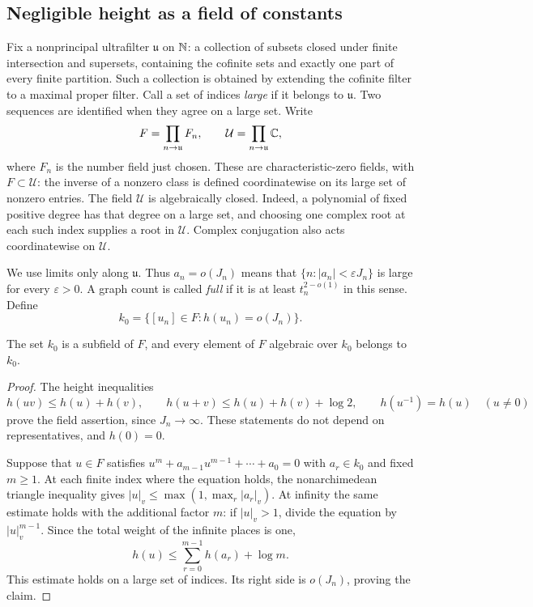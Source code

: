 \subsection{Negligible height as a field of constants}

Fix a nonprincipal ultrafilter \(\mathfrak u\) on \(\mathbb N\): a collection of
subsets closed under finite intersection and supersets, containing the
cofinite sets and exactly one part of every finite partition. Such a
collection is obtained by extending the cofinite filter to a maximal
proper filter. Call a set of indices \emph{large} if it belongs to
\(\mathfrak u\). Two sequences are identified when they agree on a large
set. Write
\[
 F=\prod_{n\to\mathfrak u} F_n,
 \qquad
 \mathcal U=\prod_{n\to\mathfrak u}\mathbb C,
\]
where \(F_n\) is the number field just chosen. These are characteristic-zero
fields, with \(F\subset\mathcal U\): the inverse of a nonzero class is
defined coordinatewise on its large set of nonzero entries. The field
\(\mathcal U\) is algebraically closed. Indeed, a polynomial of fixed
positive degree has that degree on a large set, and choosing one complex
root at each such index supplies a root in \(\mathcal U\). Complex
conjugation also acts coordinatewise on \(\mathcal U\).

We use limits only along \(\mathfrak u\). Thus \(a_n=o(J_n)\) means that
\(\{n:\lvert a_n\rvert<\varepsilon J_n\}\) is large for every
\(\varepsilon>0\). A graph count is called \emph{full}
if it is at least \(t_n^{2-o(1)}\) in this sense. Define
\[
 k_0=\bigl\{[u_n]\in F:h(u_n)=o(J_n)\bigr\}.
\]

\begin{lemma}\label{alg:small-height-field}
The set \(k_0\) is a subfield of \(F\), and every element of \(F\)
algebraic over \(k_0\) belongs to \(k_0\).
\end{lemma}

\begin{proof}
The height inequalities
\[
 h(uv)\le h(u)+h(v),\qquad
 h(u+v)\le h(u)+h(v)+\log 2,\qquad
 h(u^{-1})=h(u)\quad(u\ne0)
\]
prove the field assertion, since \(J_n\to\infty\). These statements do
not depend on representatives, and \(h(0)=0\).

Suppose that \(u\in F\) satisfies
\(u^m+a_{m-1}u^{m-1}+\cdots+a_0=0\) with \(a_r\in k_0\) and fixed
\(m\ge1\). At each finite index where the equation holds, the
nonarchimedean triangle inequality gives
\(\lvert u\rvert_v\le\max(1,\max_r\lvert a_r\rvert_v)\). At infinity
the same estimate holds with the additional factor \(m\): if
\(\lvert u\rvert_v>1\), divide the equation by
\(\lvert u\rvert_v^{m-1}\). Since the total weight of the infinite
places is one,
\[
 h(u)\le\sum_{r=0}^{m-1}h(a_r)+\log m.
\]
This estimate holds on a large set of indices. Its right side is
\(o(J_n)\), proving the claim.
\end{proof}

